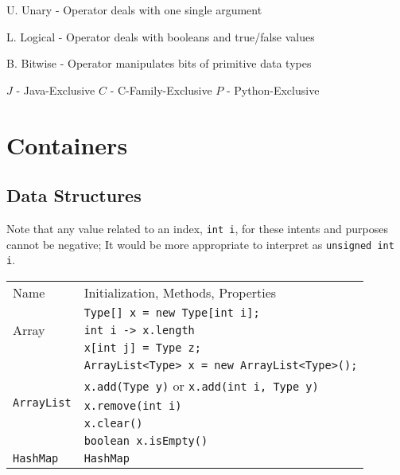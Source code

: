 \documentclass[11pt]{article}
\begin{document}
U. \quad Unary - Operator deals with one single argument

L. \quad Logical - Operator deals with booleans and true/false values

B. \quad Bitwise - Operator manipulates bits of primitive data types

\(J\) - Java-Exclusive \quad \(C\) - C-Family-Exclusive \quad \(P\) - Python-Exclusive

\section{Containers}
\subsection{Data Structures}
Note that any value related to an index, \lstinline|int i|, for these intents and purposes cannot be negative; It would be more appropriate to interpret as \lstinline|unsigned int i|. 
\setlength{\tabcolsep}{5pt}
\begin{center}\begin{tabularx}{\textwidth}{lX}\toprule
  Name & Initialization, Methods, Properties\\
  \multirow{3}{*}{Array} & \lstinline|Type[] x = new Type[int i];| \\
                         & \lstinline|int i -> x.length| \\
                         & \lstinline|x[int j] = Type z;| \\\midrule
  \multirow{5}{*}{\lstinline|ArrayList|} & \lstinline|ArrayList<Type> x = new ArrayList<Type>();| \\
                                         & \lstinline|x.add(Type y)| or \lstinline|x.add(int i, Type y)|\\
                                         & \lstinline|x.remove(int i)| \\
                                         & \lstinline|x.clear()| \\
                                         & \lstinline|boolean x.isEmpty()| \\
  \multirow{4}{*}{\lstinline|HashMap|} & \lstinline|HashMap| \\
\end{tabularx}\end{center}





\end{document}
